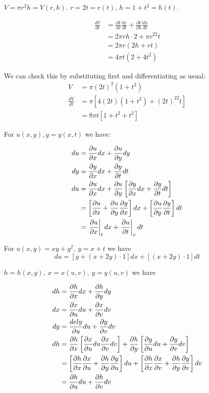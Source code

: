 \documentclass[twoside]{scrartcl}
\begin{document}
\begin{example}
$V = \pi r^2h = V(r,h)$. $r = 2t = r(t)$, $h = 1+t^2 = h(t)$. 

\setlength{\jot}{10pt} 
\[\begin{aligned}\frac{dV}{dt} &= \frac{\partial V}{\partial r}\frac{dr}{dt} + \frac{\partial V}{\partial h}\frac{dh}{dt}\\
	&= 2\pi rh \cdot 2 + \pi r^22t\\ &= 2\pi r(2h+rt)\\ 
	&= 4\pi t(2 + 4t^2)
\end{aligned}
\]

We can check this by substituting first and differentiating as usual: 
\[
\begin{aligned}
  V &= \pi (2t)^2(1+t^2)\\
  \frac{dV}{dt} &= \pi[4(2t)(1+t^2) + (2t)^22t]\\
  &= 8\pi t[1 + t^2 + t^2]
\end{aligned}
\]

\end{example}

For $u(x,y), y = y(x,t)$ we have:

\[
\begin{aligned}
  du &= \frac{\partial u}{\partial x}dx + \frac{\partial u}{\partial y}dy\\
  dy &= \frac{\partial y}{\partial x}dx + \frac{\partial y}{\partial t}dt\\
  du &= \frac{\partial u}{\partial x}dx + \frac{\partial u}{\partial y}\left[\frac{\partial y}{\partial x}dx + \frac{\partial y}{\partial t}dt\right]\\
  &= \left[\frac{\partial u}{\partial x} + \frac{\partial u}{\partial y}\frac{\partial y}{\partial x}\right]dx + \left[\frac{\partial u}{\partial y}\frac{\partial y}{\partial t}\right]dt\\
  &= \left.\frac{\partial u}{\partial x}\right|_{t}dx + \left.\frac{\partial u}{\partial t}\right|_{x}dt
\end{aligned}
\]

\begin{example}
	For $u(x,y) = xy + y^2,~ y = x + t$ we have 
	\[du = [y + (x+2y)\cdot 1]dx + [(x+2y)\cdot 1]dt\]
\end{example}

$h = h(x,y),~ x = x(u,v),~y = y(u,v)$ we have 

\[
\begin{aligned}
  dh &= \frac{\partial h}{\partial x}dx + \frac{\partial h}{\partial y}dy\\
  dx &= \frac{\partial x}{\partial u}du + \frac{\partial x}{\partial v}dv\\
  dy &= \frac{del y}{\partial u}du + \frac{\partial y}{\partial v}dv\\
  dh &= \frac{\partial h}{\partial x}\left[\frac{\partial x}{\partial u}du \frac{\partial x}{\partial v}dv\right] + \frac{\partial h}{\partial y}\left[\frac{\partial y}{\partial u}du + \frac{\partial y}{\partial v}dv\right]\\
  &= \left[\frac{\partial h}{\partial x}\frac{\partial x}{\partial u} + \frac{\partial h}{\partial y}\frac{\partial y}{\partial u}\right]du + \left[\frac{\partial h}{\partial x}\frac{\partial x}{\partial v} + \frac{\partial h}{\partial y}\frac{\partial y}{\partial v}\right]dv\\
  &= \frac{\partial h}{\partial u}du + \frac{\partial h}{\partial v}dv
\end{aligned}
\]
\end{document}
